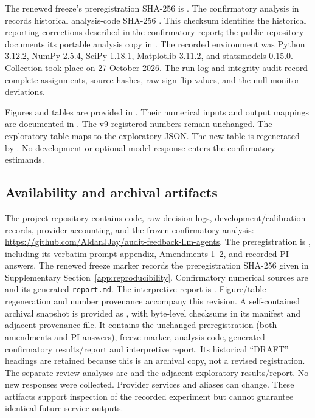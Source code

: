 \documentclass[a4paper]{article}
\begin{document}
The renewed freeze's preregistration SHA-256 is
\allowbreak{}.
The confirmatory analysis in  records historical analysis-code SHA-256
\allowbreak{}.
This checksum identifies the historical reporting corrections described in the confirmatory report; the public repository documents its portable analysis copy in . The recorded environment was Python 3.12.2, NumPy 2.5.4, SciPy 1.18.1, Matplotlib 3.11.2, and statsmodels 0.15.0. Collection took place on 27 October 2026. The run log and integrity audit record complete assignments, source hashes, raw sign-flip values, and the null-monitor deviations.

Figures and tables are provided in . Their numerical inputs and output mappings are documented in . The v9 registered numbers remain unchanged. The exploratory table  maps to the exploratory JSON. The new table is regenerated by . No development or optional-model response enters the confirmatory estimands.

\subsection{Availability and archival artifacts}\label{sec:availability}
The project repository contains code, raw decision logs, development/calibration records, provider accounting, and the frozen confirmatory analysis: \url{https://github.com/AldanJJay/audit-feedback-llm-agents}. The preregistration is , including its verbatim prompt appendix, Amendments 1--2, and recorded PI answers. The renewed freeze marker  records the preregistration SHA-256 given in Supplementary Section~\ref{app:reproducibility}. Confirmatory numerical sources are  and its generated \texttt{report.md}. The interpretive report is . Figure/table regeneration and number provenance accompany this revision. A self-contained archival snapshot is provided as , with byte-level checksums in its manifest and adjacent provenance file. It contains the unchanged preregistration (both amendments and PI answers), freeze marker, analysis code, generated confirmatory results/report and interpretive report. Its historical ``DRAFT'' headings are retained because this is an archival copy, not a revised registration. The separate review analyses are  and the adjacent exploratory results/report. No new responses were collected. Provider services and aliases can change. These artifacts support inspection of the recorded experiment but cannot guarantee identical future service outputs.
\end{document}
